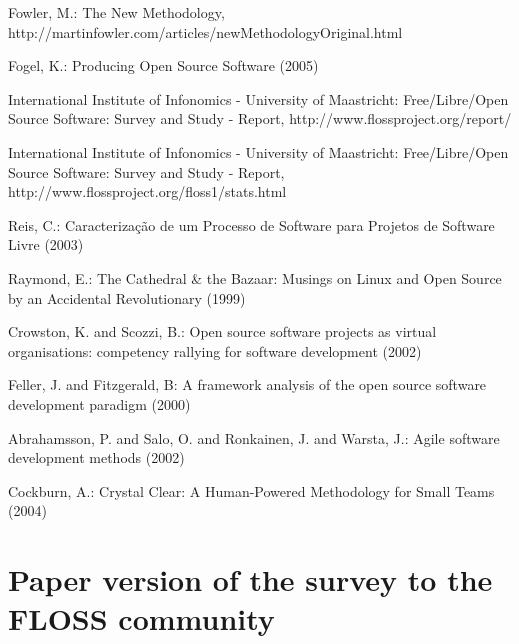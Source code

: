 \documentclass[lnbip]{svmultln}
\begin{document}
\begin{thebibliography}{5}
 Fowler, M.: The New Methodology,
  http://martinfowler.com/articles/newMethodologyOriginal.html

 Fogel, K.: Producing Open Source Software (2005)

 International Institute of Infonomics -
  University of Maastricht: Free/Libre/Open Source Software: Survey
  and Study - Report, http://www.flossproject.org/report/

 International Institute of Infonomics -
  University of Maastricht: Free/Libre/Open Source Software: Survey
  and Study - Report, http://www.flossproject.org/floss1/stats.html

 Reis, C.: Caracteriza\c{c}\~{a}o de um Processo de
  Software para Projetos de Software Livre (2003)

 Raymond, E.: The Cathedral \& the Bazaar:
  Musings on {Linux} and Open Source by an Accidental Revolutionary
  (1999)

 Crowston, K. and Scozzi, B.: Open source
  software projects as virtual organisations: competency rallying for
  software development (2002)

 Feller, J. and Fitzgerald, B: A framework
  analysis of the open source software development paradigm (2000)

 Abrahamsson, P. and Salo, O. and Ronkainen,
  J. and Warsta, J.: Agile software development methods (2002)

 Cockburn, A.: Crystal Clear: A Human-Powered
  Methodology for Small Teams (2004)
\end{thebibliography}

\appendix
\section{Paper version of the survey to the FLOSS community}
\label{appendix:a}
\end{document}
